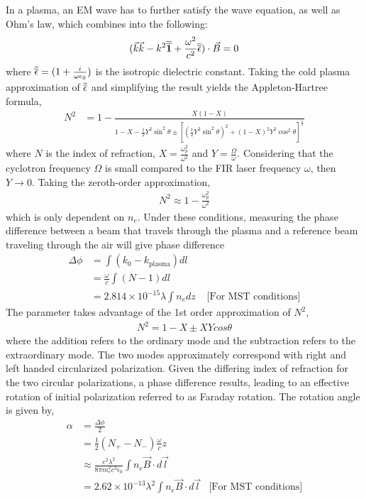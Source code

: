 In a plasma, an EM wave has to further satisfy the wave equation, as well as Ohm's law, which combines into the following:
\begin{align}
    (\vec{k}\vec{k} - k^2\overline{\overline{\textbf{1}}} + \frac{\omega^2}{c^2}\overline{\overline{\epsilon}})\cdot\vec{B} = 0
\end{align}
where $\overline{\overline{\epsilon}} = (1+\frac{i}{\omega\epsilon_0})$ is the isotropic dielectric constant. Taking the cold plasma approximation of $\overline{\overline{\epsilon}}$ and simplifying the result yields the Appleton-Hartree formula\cite{hutchinson_2002},
\begin{align}
    N^2 &= 1 - \frac{X(1-X)}{1-X-\frac{1}{2}Y^2 \sin^2\theta\pm [(\frac{1}{2}Y^2\sin^2\theta)^2 + (1-X)^2Y^2\cos^2\theta]^{\frac{1}{2}}}
\end{align}
where $N$ is the index of refraction, $X = \frac{\omega_p^2}{\omega^2}$ and $Y = \frac{\Omega}{\omega}$. Considering that the cyclotron frequency $\Omega$ is small compared to the FIR laser frequency $\omega$, then $Y \rightarrow 0$. Taking the zeroth-order approximation\cite{hutchinson_2002},
\begin{align}
N^2 \approx 1 - \frac{\omega_p^2}{\omega^2}
\end{align}
which is only dependent on $n_e$. Under these conditions, measuring the phase difference between a beam that travels through the plasma and a reference beam traveling through the air will give phase difference
\begin{align}
    \Delta\phi &= \int(k_0 - k_{\text{plasma}})dl \nonumber\\
    &= \frac{\omega}{c}\int(N - 1)dl \nonumber \\
    &= 2.814\times10^{-15}\lambda\int n_e dz 
    &\text{\ [For MST conditions]}
\end{align}
The parameter takes advantage of the 1st order approximation of $N^2$,
\begin{align}
    N^2 = 1 - X \pm XY cos \theta
\end{align}
where the addition refers to the ordinary mode and the subtraction refers to the extraordinary mode. The two modes approximately correspond with right and left handed circularized polarization. Given the differing index of refraction for the two circular polarizations, a phase difference results, leading to an effective rotation of initial polarization referred to as Faraday rotation. The rotation angle is given by,
\begin{align}
    \alpha &= \frac{\Delta \phi}{2}\nonumber\\
    &= \frac{1}{2}(N_+ - N_-)\frac{\omega}{c}z \\
    &\approx \frac{e^2 \lambda^2}{8\pi m^2_e c^3 \epsilon_0}\int n_e \vec{B}\cdot d\vec{l} \nonumber \\
    &= 2.62\times10^{-13}\lambda^2\int n_e \vec{B}\cdot d\vec{l} &\text{[For MST conditions]}
\end{align}

